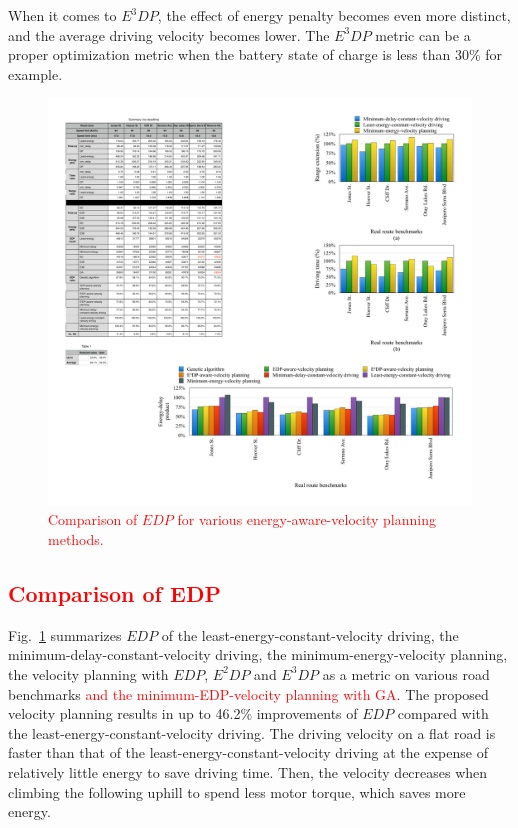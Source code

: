 \documentclass{IEEEtran}
\begin{document}
When it comes to $E^3DP$, the effect of energy penalty becomes even more distinct, and the average driving velocity becomes lower. 
The $E^3DP$ metric can be a proper optimization metric when the battery state of charge is less than 30\% for example.


\begin{figure}	 %
\centering
\includegraphics[width=0.85\hsize]{Figures/EDP_comp_bar.pdf}
\caption{\textcolor{red}{Comparison of $EDP$ for various energy-aware-velocity planning methods.}}
\label{fig:EDP_bar}
\end{figure} 

\textcolor{red}{\subsection{Comparison of EDP}}

Fig.~\ref{fig:EDP_bar} summarizes $EDP$ of the least-energy-constant-velocity driving, the minimum-delay-constant-velocity driving, the minimum-energy-velocity planning, the velocity planning with $EDP$, $E^2DP$ and $E^3DP$ as a metric on various road benchmarks \textcolor{red}{and the minimum-EDP-velocity planning with GA}. The proposed velocity planning results in up to 46.2\% improvements of $EDP$ compared with the least-energy-constant-velocity driving. 
The driving velocity on a flat road is faster than that of the least-energy-constant-velocity driving at the expense of relatively little energy to save driving time. Then, the velocity decreases when climbing the following uphill to spend less motor torque, which saves more energy.
\end{document}
